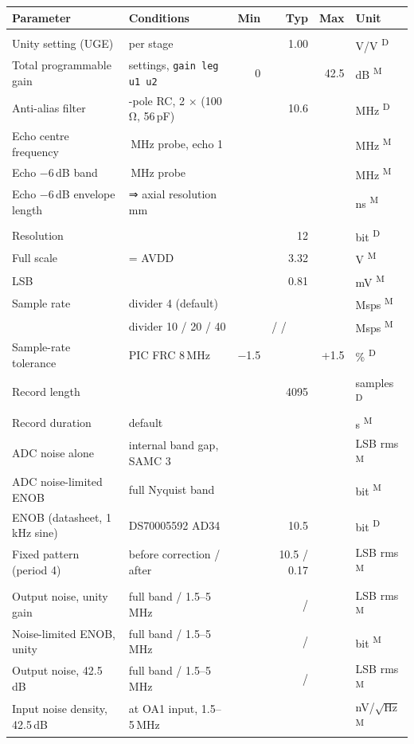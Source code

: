 \documentclass[10pt,a4paper]{article}
\makeatletter
\newcommand{\cmd}[1]{\texttt{#1}}
\newcommand{\meas}{\textsuperscript{M}}
\newcommand{\des}{\textsuperscript{D}}
\newenvironment{spec}[1]{%
  \small\begin{longtable}{@{}>{\raggedright\arraybackslash}p{50mm}>{\raggedright\arraybackslash}p{55mm}rrrl@{}}
  \toprule\textbf{Parameter} & \textbf{Conditions} & \textbf{Min} & \textbf{Typ} & \textbf{Max} & \textbf{Unit}\\\midrule\endhead
  \multicolumn{6}{@{}l}{\color{accent}\bfseries #1}\\}{\bottomrule\end{longtable}}
\newcommand{\grp}[1]{\multicolumn{6}{@{}l}{\color{accent}\bfseries #1}\\}
\makeatother
\begin{document}
\begin{spec}{Transmit (pulser)}
Unity setting (UGE) & per stage & & 1.00 & & V/V \des\\
Total programmable gain & 9 settings, \cmd{gain leg u1 u2} & 0 & & 42.5 & dB \meas\\
Anti-alias filter & 2-pole RC, 2 × (100\,Ω, 56\,pF) & & 10.6 & & MHz \des\\
Echo centre frequency & 3.3\,MHz probe, echo 1 & & \vfcen & & MHz \meas\\
Echo −6\,dB band & 3.3\,MHz probe & \vbwlo & & \vbwhi & MHz \meas\\
Echo −6\,dB envelope length & ⇒ axial resolution \vaxres\,mm & & \vpulselen & & ns \meas\\
\grp{ADC and acquisition}
Resolution & & & 12 & & bit \des\\
Full scale & = AVDD & & 3.32 & & V \meas\\
LSB & & & 0.81 & & mV \meas\\
Sample rate & divider 4 (default) & & \vfsdivfour & & Msps \meas\\
 & divider 10 / 20 / 40 & & \multicolumn{2}{l}{\vfsdivten{} / \vfsdivtwenty{} / \vfsdivforty} & Msps \meas\\
Sample-rate tolerance & PIC FRC 8\,MHz & −1.5 & & +1.5 & \% \des\\
Record length & & & 4095 & & samples \des\\
Record duration & default & & \vfilldivfour & & \textmu s \meas\\
ADC noise alone & internal band gap, SAMC 3 & & \vadcsigma & & LSB rms \meas\\
ADC noise-limited ENOB & full Nyquist band & & \vadcenob & & bit \meas\\
ENOB (datasheet, 1\,kHz sine) & DS70005592 AD34 & & 10.5 & & bit \des\\
Fixed pattern (period 4) & before correction / after & & 10.5 / 0.17 & & LSB rms \meas\\
\grp{System noise (ADC node, no pulse, transducer connected, correction on)}
Output noise, unity gain & full band / 1.5–5\,MHz & & \vnzunity{} / \vnzbandunity & & LSB rms \meas\\
Noise-limited ENOB, unity & full band / 1.5–5\,MHz & & \venobunity{} / \venobbandunity & & bit \meas\\
Output noise, 42.5\,dB & full band / 1.5–5\,MHz & & \vnzmax{} / \vnzbandmax & & LSB rms \meas\\
Input noise density, 42.5\,dB & at OA1 input, 1.5–5\,MHz & & \veninmax & & nV/$\sqrt{\text{Hz}}$ \meas\\

\end{spec}
\end{document}
